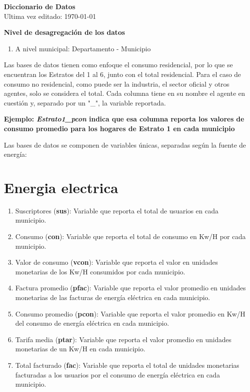 \documentclass[12pt,a4paper]{article}
\begin{document}
\begin{center}
	\textbf{Diccionario de Datos} \\
	Ultima vez editado: \today
\end{center}
\vspace{10mm}

\textbf{Nivel de desagregación de los datos}
\begin{enumerate}
	\item A nivel municipal: Departamento - Municipio
\end{enumerate}

Las bases de datos tienen como enfoque el consumo residencial, por lo que se encuentran los Estratos del 1 al 6, junto con el total residencial. Para el caso de consumo no residencial, como puede ser la industria, el sector oficial y otros agentes, solo se considera el total. Cada columna tiene en su nombre el agente en cuestión y, separado por un "\_", la variable reportada.

\begin{center}
	\textbf{\textbf{Ejemplo}: \textit{Estrato1\_pcon }indica que esa columna reporta los valores de consumo promedio para los hogares de Estrato 1 en cada municipio} 
\end{center}

Las bases de datos se componen de variables únicas, separadas según la fuente de energía:

\section{Energia electrica}

\begin{enumerate}
	\item Suscriptores (\textbf{sus}): Variable que reporta el total de usuarios en cada municipio.
	\item Consumo (\textbf{con}): Variable que reporta el total de consumo en Kw/H por cada municipio.
	\item Valor de consumo (\textbf{vcon}): Variable que reporta el valor en unidades monetarias de los Kw/H consumidos por cada municipio.
	\item Factura promedio (\textbf{pfac}): Variable que reporta el valor promedio en unidades monetarias de las facturas de energía eléctrica en cada municipio.
	\item Consumo promedio (\textbf{pcon}): Variable que reporta el valor promedio en Kw/H del consumo de energía eléctrica en cada municipio.
	\item Tarifa media (\textbf{ptar}): Variable que reporta el valor promedio en unidades monetarias de un Kw/H en cada municipio.
	\item Total facturado (\textbf{fac}): Variable que reporta el total de unidades monetarias facturadas a los usuarios por el consumo de energía eléctrica en cada municipio.
	
\end{enumerate}
\end{document}
